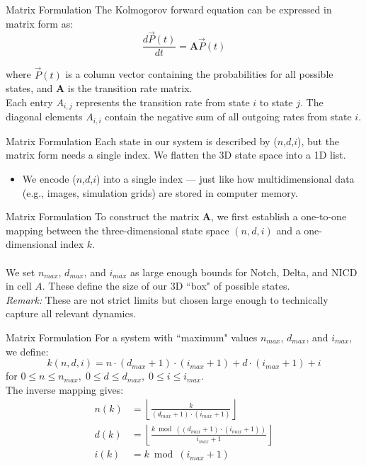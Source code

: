 \documentclass[aspectratio=169]{beamer}
\begin{document}
\begin{frame}{Matrix Formulation}
The Kolmogorov forward equation can be expressed in matrix form as:
\[
\frac{d\vec{P}(t)}{dt} = \mathbf{A} \vec{P}(t)
\]

where $\vec{P}(t)$ is a column vector containing the probabilities for all possible states, and $\mathbf{A}$ is the transition rate matrix.\\
Each entry $A_{i,j}$ represents the transition rate from state $i$ to state $j$. The diagonal elements $A_{i,i}$ contain the negative sum of all outgoing rates from state $i$.

\end{frame}

\begin{frame}{Matrix Formulation}
Each state in our system is described by ($n$,$d$,$i$), but the matrix form needs a single index.
\vfill
\pause
We flatten the 3D state space into a 1D list.\\
\begin{itemize}
    \item We encode ($n$,$d$,$i$) into a single index — just like how multidimensional data (e.g., images, simulation grids) are stored in computer memory.
\end{itemize}
\end{frame}

\begin{frame}{Matrix Formulation}
To construct the matrix $\mathbf{A}$, we first establish a one-to-one mapping between the three-dimensional state space $(n,d,i)$ and a one-dimensional index $k$. \\~\\

We set $n_{max}$, $d_{max}$, and $i_{max}$ as large enough bounds for Notch, Delta, and NICD in cell $A$. These define the size of our 3D ``box" of possible states. \\
\textit{Remark:} These are not strict limits but chosen large enough to technically capture all relevant dynamics.
\end{frame}

\begin{frame}{Matrix Formulation}
For a system with ``maximum" values $n_{max}$, $d_{max}$, and $i_{max}$, we define:
\[
k(n,d,i) = n \cdot (d_{max}+1) \cdot (i_{max}+1) + d \cdot (i_{max}+1) + i
\]
for $0 \leq n \leq n_{max}, \; 0 \leq d \leq d_{max}, \; 0 \leq i \leq i_{max}$. \\
The inverse mapping gives:
\begin{align*}
n(k) &= \left\lfloor \frac{k}{(d_{max}+1) \cdot (i_{max}+1)} \right\rfloor \\
d(k) &= \left\lfloor \frac{k \bmod ((d_{max}+1) \cdot (i_{max}+1))}{i_{max}+1} \right\rfloor \\
i(k) &= k \bmod (i_{max}+1)
\end{align*}
\end{frame}
\end{document}
